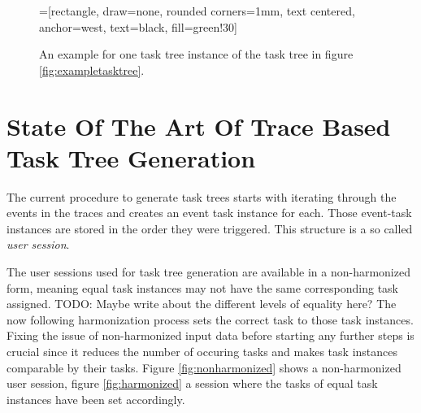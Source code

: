	\begin{figure}
		=[rectangle, draw=none, rounded corners=1mm,
		        text centered, anchor=west, text=black, fill=green!30]

		\caption{An example for one task tree instance of the task tree in figure \ref{fig:exampletasktree}\cite{harms2013}.}
		\label{fig:exampletaskinstancetree}
	\end{figure}

\section{State Of The Art Of Trace Based Task Tree Generation}
The current procedure to generate task trees\cite{harms2013} starts with iterating through the events in the traces and creates an event task instance for each.
Those event-task instances are stored in the order they were triggered.  This structure is a so called \textit{user session}.

The user sessions used for task tree generation are available in a non-harmonized form,
meaning equal task instances may not have the same corresponding task assigned. TODO: Maybe write about the different levels of equality here?
The now following harmonization process sets the correct task to those task instances.
Fixing the issue of non-harmonized input data before starting any further steps is crucial since it reduces the number of occuring tasks and makes task instances
comparable by their tasks. Figure \ref{fig:nonharmonized} shows a non-harmonized user session, figure \ref{fig:harmonized} a session where the tasks of equal task instances have been set accordingly.

